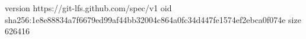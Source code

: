 version https://git-lfs.github.com/spec/v1
oid sha256:1e8e88834a7f6679ed99af44bb32004c864a0fc34d447fe1574ef2ebca0f074e
size 626416
